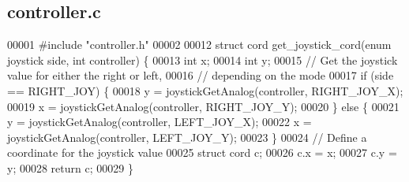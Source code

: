 \subsection{controller.\+c}
\label{controller_8c_source}

\begin{DoxyCode}
00001 \textcolor{preprocessor}{#include "controller.h"}
00002 
00012 \textcolor{keyword}{struct }cord get_joystick_cord(enum joystick side, int controller) \{
00013   \textcolor{keywordtype}{int} x;
00014   \textcolor{keywordtype}{int} y;
00015   \textcolor{comment}{// Get the joystick value for either the right or left,}
00016   \textcolor{comment}{// depending on the mode}
00017   \textcolor{keywordflow}{if} (side == RIGHT_JOY) \{
00018     y = joystickGetAnalog(controller, RIGHT\_JOY\_X);
00019     x = joystickGetAnalog(controller, RIGHT\_JOY\_Y);
00020   \} \textcolor{keywordflow}{else} \{
00021     y = joystickGetAnalog(controller, LEFT\_JOY\_X);
00022     x = joystickGetAnalog(controller, LEFT\_JOY\_Y);
00023   \}
00024   \textcolor{comment}{// Define a coordinate for the joystick value}
00025   \textcolor{keyword}{struct }cord c;
00026   c.x = x;
00027   c.y = y;
00028   \textcolor{keywordflow}{return} c;
00029 \}
\end{DoxyCode}
